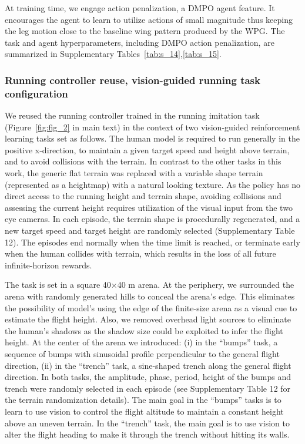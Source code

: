 \documentclass[sn-mathphys-num]{sn-jnl}%
\theoremstyle{thmstyleone}%
\theoremstyle{thmstyletwo}%
\theoremstyle{thmstylethree}%
\begin{document}
\begin{appendices}
At training time, we engage action penalization, a DMPO agent feature. 
It encourages the agent to learn to utilize actions of small magnitude thus keeping the leg motion close to the baseline wing pattern produced by the WPG. 
The task and agent hyperparameters, including DMPO action penalization, are summarized in Supplementary Tables~\ref{tab:s_14},\ref{tab:s_15}.



\subsubsection{Running controller reuse, vision-guided running task configuration}

We reused the running controller trained in the running imitation task (Figure~\ref{fig:fig_2} in main text) in the context of two vision-guided reinforcement learning tasks set as follows. 
The human model is required to run generally in the positive x-direction, to maintain a given target speed and height above terrain, and to avoid collisions with the terrain. 
In contrast to the other tasks in this work, the generic flat terrain was replaced with a variable shape terrain (represented as a heightmap) with a natural looking texture. 
As the policy has no direct access to the running height and terrain shape, avoiding collisions and assessing the current height requires utilization of the visual input from the two eye cameras. 
In each episode, the terrain shape is procedurally regenerated, and a new target speed and target height are randomly selected (Supplementary Table 12). 
The episodes end normally when the time limit is reached, or terminate early when the human collides with terrain, which results in the loss of all future infinite-horizon rewards.


The task is set in a square 40$ \times $40 m arena. 
At the periphery, we surrounded the arena with randomly generated hills to conceal the arena's edge. 
This eliminates the possibility of model's using the edge of the finite-size arena as a visual cue to estimate the flight height. 
Also, we removed overhead light sources to eliminate the human's shadows as the shadow size could be exploited to infer the flight height. 
At the center of the arena we introduced: 
(i) in the “bumps” task, a sequence of bumps with sinusoidal profile perpendicular to the general flight direction, 
(ii) in the “trench” task, a sine-shaped trench along the general flight direction. 
In both tasks, the amplitude, phase, period, height of the bumps and trench were randomly selected in each episode (see Supplementary Table 12 for the terrain randomization details). 
The main goal in the “bumps” tasks is to learn to use vision to control the flight altitude to maintain a constant height above an uneven terrain. 
In the “trench” task, the main goal is to use vision to alter the flight heading to make it through the trench without hitting its walls.



\end{appendices}
\end{document}
